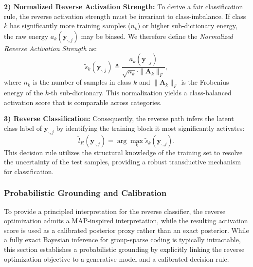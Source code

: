 \documentclass[10pt,comsoc]{IEEEtran}
\begin{document}
\textbf{2) Normalized Reverse Activation Strength:}
To derive a fair classification rule, the reverse activation strength must be invariant to class-imbalance. If class $k$ has significantly more training samples ($n_k$) or higher sub-dictionary energy, the raw energy $a_k(\mathbf{y}_{\cdot,j})$ may be biased. We therefore define the \textit{Normalized Reverse Activation Strength} as:
\begin{equation}
\label{eq:normalized_a_k}
\tilde{s}_k(\mathbf{y}_{\cdot,j}) \triangleq \frac{a_k(\mathbf{y}_{\cdot,j})}{\sqrt{n_k} \cdot \|\mathbf{A}_k\|_F},
\end{equation}
where $n_k$ is the number of samples in class $k$ and $\|\mathbf{A}_k\|_F$ is the Frobenius energy of the $k$-th sub-dictionary. This normalization yields a class-balanced activation score that is comparable across categories.

\textbf{3) Reverse Classification:}
Consequently, the reverse path infers the latent class label of $\mathbf{y}_{\cdot,j}$ by identifying the training block it most significantly activates:
\begin{equation}
\label{eq:reverse_decision}
\hat{l}_R(\mathbf{y}_{\cdot,j}) = \arg\max_{k} \tilde{s}_k(\mathbf{y}_{\cdot,j}).
\end{equation}
This decision rule utilizes the structural knowledge of the training set to resolve the uncertainty of the test samples, providing a robust transductive mechanism for classification.

\subsubsection{Probabilistic Grounding and Calibration}
To provide a principled interpretation for the reverse classifier, the reverse optimization admits a MAP-inspired interpretation, while the resulting activation score is used as a calibrated posterior proxy rather than an exact posterior. While a fully exact Bayesian inference for group-sparse coding is typically intractable, this section establishes a probabilistic grounding by explicitly linking the reverse optimization objective to a generative model and a calibrated decision rule.
\end{document}
